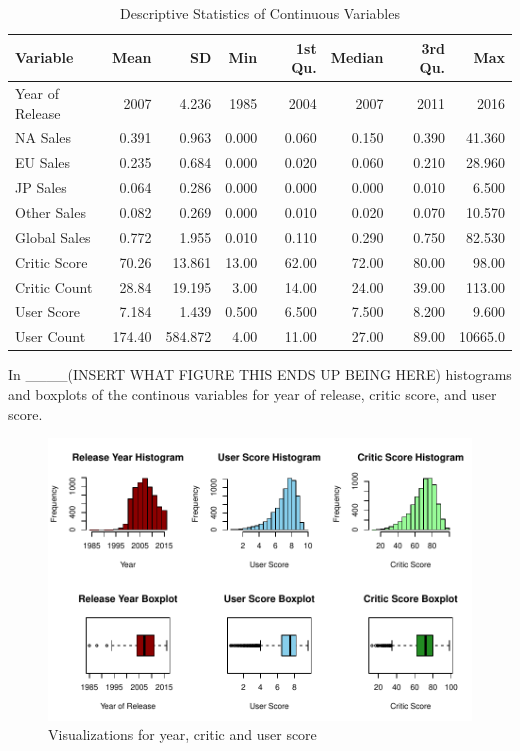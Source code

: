 \documentclass[12pt]{article}
\begin{document}
\begin{table}[ht]
  \caption{Descriptive Statistics of Continuous Variables}
\label{tab:ds}
\centering
\begin{tabular}{lrrrrrrr}
    \hline
  Variable & Mean & SD & Min & 1st Qu. & Median & 3rd Qu. & Max \\ 
    \hline
    Year of Release & 2007 & 4.236 & 1985 & 2004 & 2007 & 2011 & 2016\\ 
    NA Sales & 0.391 & 0.963 & 0.000 & 0.060 & 0.150 & 0.390 & 41.360\\ 
    EU Sales & 0.235 & 0.684 & 0.000 & 0.020 & 0.060 & 0.210 & 28.960\\ 
    JP Sales & 0.064 & 0.286 & 0.000 & 0.000 & 0.000 & 0.010 & 6.500\\ 
    Other Sales & 0.082 & 0.269 & 0.000 & 0.010 & 0.020 & 0.070 & 10.570\\ 
    Global Sales & 0.772 & 1.955 & 0.010 & 0.110 & 0.290 & 0.750 & 82.530\\ 
    Critic Score & 70.26 & 13.861 & 13.00 & 62.00 & 72.00 & 80.00 & 98.00\\
    Critic Count & 28.84 & 19.195 & 3.00 & 14.00 & 24.00 & 39.00 & 113.00\\
    User Score & 7.184 & 1.439 & 0.500 & 6.500 & 7.500 & 8.200 & 9.600\\ 
    User Count & 174.40 & 584.872 & 4.00 & 11.00 & 27.00 & 89.00 & 10665.0\\
     \hline
  \end{tabular}
  \end{table}

In ____(INSERT WHAT FIGURE THIS ENDS UP BEING HERE) histograms and boxplots of the continous variables for year of release, critic score, and user score.
\begin{figure}[tbp]
  \centering
  \includegraphics[width=\textwidth]{histandboxpt1.pdf}
  \caption{Visualizations for year, critic and user score}
  \label{fig:histandboxpt1}
\end{figure}
\end{document}

